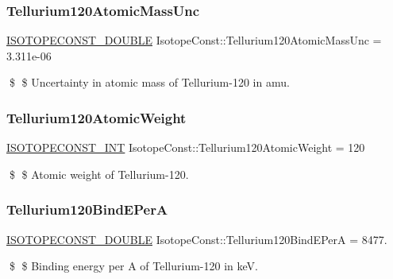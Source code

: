 \subsubsection{\texorpdfstring{Tellurium120\+Atomic\+Mass\+Unc}{Tellurium120AtomicMassUnc}}
{\footnotesize\ttfamily \mbox{\hyperlink{group___isotope_const-_macros_ga8f45a7272ce02c0b4c65c44636ed719a}{I\+S\+O\+T\+O\+P\+E\+C\+O\+N\+S\+T\+\_\+\+D\+O\+U\+B\+LE}} Isotope\+Const\+::\+Tellurium120\+Atomic\+Mass\+Unc = 3.\+311e-\/06}

\$ \$ Uncertainty in atomic mass of Tellurium-\/120 in amu. \mbox{\label{group___isotope_const-_tellurium-_te120_ga842f09fc762dd979f82d03b23f6bb1ad}} 
\subsubsection{\texorpdfstring{Tellurium120\+Atomic\+Weight}{Tellurium120AtomicWeight}}
{\footnotesize\ttfamily \mbox{\hyperlink{group___isotope_const-_macros_ga5f18360b3e99483a35c32d789e62621c}{I\+S\+O\+T\+O\+P\+E\+C\+O\+N\+S\+T\+\_\+\+I\+NT}} Isotope\+Const\+::\+Tellurium120\+Atomic\+Weight = 120}

\$ \$ Atomic weight of Tellurium-\/120. \mbox{\label{group___isotope_const-_tellurium-_te120_ga3fad3c8a20fe38f3a1b253b44a8f1329}} 
\subsubsection{\texorpdfstring{Tellurium120\+Bind\+E\+PerA}{Tellurium120BindEPerA}}
{\footnotesize\ttfamily \mbox{\hyperlink{group___isotope_const-_macros_ga8f45a7272ce02c0b4c65c44636ed719a}{I\+S\+O\+T\+O\+P\+E\+C\+O\+N\+S\+T\+\_\+\+D\+O\+U\+B\+LE}} Isotope\+Const\+::\+Tellurium120\+Bind\+E\+PerA = 8477.}

\$ \$ Binding energy per A of Tellurium-\/120 in keV. \mbox{\label{group___isotope_const-_tellurium-_te120_gaf17f4e07a01c098f9a9086d5c21a0a5b}} 
